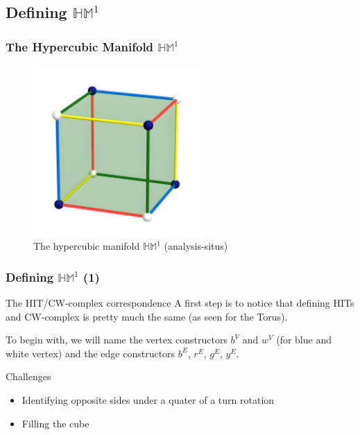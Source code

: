 \documentclass{beamer}
\begin{document}
    \subsection{Defining $\mathbb{HM}^1$}
    \begin{frame}
        \frametitle{The Hypercubic Manifold $\mathbb{HM}^1$}
        \begin{figure}[h]
        \begin{center}
            \includegraphics[height= 6.5cm]{cube-3-2.png}
            \caption{The hypercubic manifold $\mathbb{HM}^1$ (analysis-situs)}
            \label{fig:H1M}
        \end{center}
        \end{figure}
    \end{frame}
    \begin{frame}[fragile]
        \frametitle{Defining $\mathbb{HM}^1$ (1)}
        \begin{exampleblock}{The HIT/CW-complex correspondence}
            A first step is to notice that defining HITs and CW-complex is pretty much the same (as seen for the Torus).
        \end{exampleblock}
        \pause
        To begin with, we will name the vertex constructors $b^V$ and $w^V$ (for blue and white vertex) and the edge constructors $b^E$, $r^E$, $g^E$, $y^E$. 
        \pause
        \begin{exampleblock}{Challenges}
            \begin{itemize}
                \item Identifying opposite sides under a quater of a turn rotation
                \item Filling the cube
            \end{itemize}
        \end{exampleblock}
    \end{frame}
\end{document}

